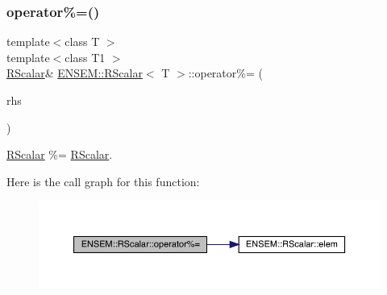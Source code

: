 \mbox{\label{classENSEM_1_1RScalar_ac5ab25042d679a621ccb42d13fb3b441}} 
\subsubsection{\texorpdfstring{operator\%=()}{operator\%=()}\hspace{0.1cm}{\footnotesize\ttfamily [1/2]}}
{\footnotesize\ttfamily template$<$class T $>$ \\
template$<$class T1 $>$ \\
\mbox{\hyperlink{classENSEM_1_1RScalar}{R\+Scalar}}\& \mbox{\hyperlink{classENSEM_1_1RScalar}{E\+N\+S\+E\+M\+::\+R\+Scalar}}$<$ T $>$\+::operator\%= (\begin{DoxyParamCaption}\item[{const \mbox{\hyperlink{classENSEM_1_1RScalar}{R\+Scalar}}$<$ T1 $>$ \&}]{rhs }\end{DoxyParamCaption})\hspace{0.3cm}{\ttfamily [inline]}}



\mbox{\hyperlink{classENSEM_1_1RScalar}{R\+Scalar}} \%= \mbox{\hyperlink{classENSEM_1_1RScalar}{R\+Scalar}}. 

Here is the call graph for this function\+:
\nopagebreak
\begin{figure}[H]
\begin{center}
\leavevmode
\includegraphics[width=350pt]{d0/d8c/classENSEM_1_1RScalar_ac5ab25042d679a621ccb42d13fb3b441_cgraph}
\end{center}
\end{figure}
\mbox{\label{classENSEM_1_1RScalar_ac5ab25042d679a621ccb42d13fb3b441}} 
